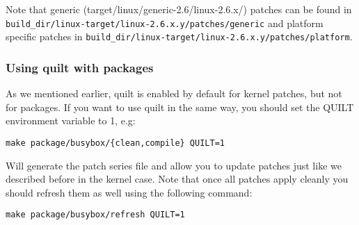 Note that generic (target/linux/generic-2.6/linux-2.6.x/) patches can be found in 
\texttt{build\_dir/linux-target/linux-2.6.x.y/patches/generic} and platform specific
patches in \texttt{build\_dir/linux-target/linux-2.6.x.y/patches/platform}.

\subsubsection{Using quilt with packages}

As we mentioned earlier, quilt is enabled by default for kernel patches, but not for
packages. If you want to use quilt in the same way, you should set the QUILT environment
variable to 1, e.g:

\begin{Verbatim}
make package/busybox/{clean,compile} QUILT=1
\end{Verbatim}

Will generate the patch series file and allow you to update patches just like we described
before in the kernel case. Note that once all patches apply cleanly you should refresh them
as well using the following command:

\begin{Verbatim}
make package/busybox/refresh QUILT=1
\end{Verbatim}
